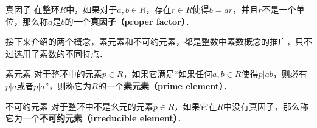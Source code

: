 \begin{definition}{真因子}
在整环$R$中，如果对于$a, b\in R$，存在$r\in R$使得$b=ar$，并且$r$不是一个单位，那么称$a$是$b$的一个\textbf{真因子（proper factor）}．
\end{definition}

接下来介绍的两个概念，素元素和不可约元素，都是整数中素数概念的推广，只不过选用了素数的不同特点．

\begin{definition}{素元素}
对于整环中的元素$p\in R$，如果它满足“如果任何$a, b\in R$使得$p|ab$，则必有$p|a$或者$p|a$”，则称它为$R$的一个\textbf{素元素（prime element）}．
\end{definition}

\begin{definition}{不可约元素}
对于整环中不是幺元的元素$p\in R$，如果它在$R$中没有真因子，那么称它为一个\textbf{不可约元素（irreducible element）}．
\end{definition}





